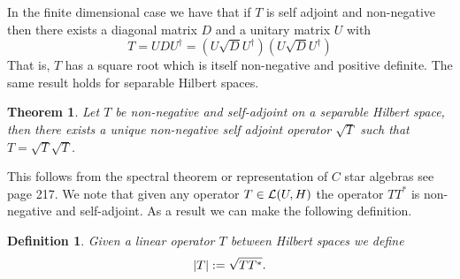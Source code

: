 \documentclass[12pt]{article}
\newtheorem{theorem}{Theorem}
\newtheorem{definition}{Definition}
\begin{document}
In the finite dimensional case we have that if $T$ is self adjoint and non-negative then there exists a diagonal matrix $D$ and a unitary matrix $U$ with
\begin{equation*}
	T=UDU^\dagger=(U\sqrt{D}U^\dagger)(U\sqrt{D}U^\dagger)
\end{equation*}
That is, $T$ has a square root which is itself non-negative and positive definite. The same result holds for separable Hilbert spaces.
\begin{theorem}
	Let $T$ be non-negative and self-adjoint on a separable Hilbert space, then there exists a unique non-negative self adjoint operator $\sqrt{T}$ such that $T=\sqrt{T}\sqrt{T}$.
\end{theorem}
This follows from the spectral theorem or representation of $C$ star algebras see \cite{lototsky2017stochastic} page 217. We note that given any operator $T\in \mathcal{L}(U,H)$ the operator $TT^*$ is non-negative and self-adjoint. As a result we can make the following definition.
\begin{definition}
	Given a linear operator $T$ between Hilbert spaces we define
	\begin{equation*}
		\abs{T}:=\sqrt{T T^*}  .
	\end{equation*}

\end{definition}
\end{document}
